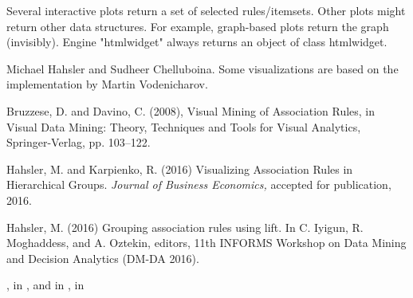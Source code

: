 \documentclass[letterpaper]{book}
\begin{document}
%
\begin{Value}
Several interactive plots return a set of selected rules/itemsets. Other plots
might return other data structures. For example, graph-based
plots return the graph (invisibly). Engine "htmlwidget" always returns an object of class htmlwidget. 
\end{Value}
%
\begin{Author}\relax
Michael Hahsler and Sudheer Chelluboina. Some visualizations are based on 
the implementation by Martin Vodenicharov.
\end{Author}
%
\begin{References}\relax
Bruzzese, D. and Davino, C. (2008), Visual Mining of Association Rules, in
Visual Data Mining: Theory, Techniques and Tools for Visual Analytics,
Springer-Verlag, pp. 103--122.

Hahsler, M. and Karpienko, R. (2016) Visualizing Association Rules in Hierarchical Groups. \emph{Journal of Business Economics,} accepted for publication, 2016.

Hahsler, M. (2016) Grouping association rules using lift. In C. Iyigun, R. Moghaddess, and A. Oztekin, editors, 11th INFORMS Workshop on Data Mining and Decision Analytics (DM-DA 2016).
\end{References}
%
\begin{SeeAlso}\relax
{},
 in ,
 and
 in ,
 in 
\end{SeeAlso}
%
\end{document}
